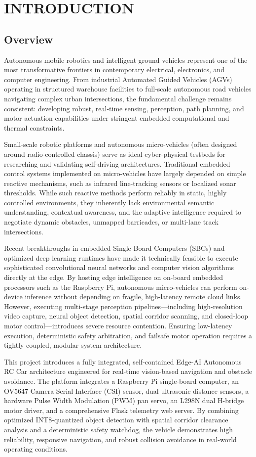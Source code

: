 \chapter{INTRODUCTION}

\section{Overview}
Autonomous mobile robotics and intelligent ground vehicles represent one of the most transformative frontiers in contemporary electrical, electronics, and computer engineering. From industrial Automated Guided Vehicles (AGVs) operating in structured warehouse facilities to full-scale autonomous road vehicles navigating complex urban intersections, the fundamental challenge remains consistent: developing robust, real-time sensing, perception, path planning, and motor actuation capabilities under stringent embedded computational and thermal constraints. 

Small-scale robotic platforms and autonomous micro-vehicles (often designed around radio-controlled chassis) serve as ideal cyber-physical testbeds for researching and validating self-driving architectures. Traditional embedded control systems implemented on micro-vehicles have largely depended on simple reactive mechanisms, such as infrared line-tracking sensors or localized sonar thresholds. While such reactive methods perform reliably in static, highly controlled environments, they inherently lack environmental semantic understanding, contextual awareness, and the adaptive intelligence required to negotiate dynamic obstacles, unmapped barricades, or multi-lane track intersections.

Recent breakthroughs in embedded Single-Board Computers (SBCs) and optimized deep learning runtimes have made it technically feasible to execute sophisticated convolutional neural networks and computer vision algorithms directly at the edge. By hosting edge intelligence on on-board embedded processors such as the Raspberry Pi, autonomous micro-vehicles can perform on-device inference without depending on fragile, high-latency remote cloud links. However, executing multi-stage perception pipelines—including high-resolution video capture, neural object detection, spatial corridor scanning, and closed-loop motor control—introduces severe resource contention. Ensuring low-latency execution, deterministic safety arbitration, and failsafe motor operation requires a tightly coupled, modular system architecture.

This project introduces a fully integrated, self-contained Edge-AI Autonomous RC Car architecture engineered for real-time vision-based navigation and obstacle avoidance. The platform integrates a Raspberry Pi single-board computer, an OV5647 Camera Serial Interface (CSI) sensor, dual ultrasonic distance sensors, a hardware Pulse Width Modulation (PWM) pan servo, an L298N dual H-bridge motor driver, and a comprehensive Flask telemetry web server. By combining optimized INT8-quantized object detection with spatial corridor clearance analysis and a deterministic safety watchdog, the vehicle demonstrates high reliability, responsive navigation, and robust collision avoidance in real-world operating conditions.

